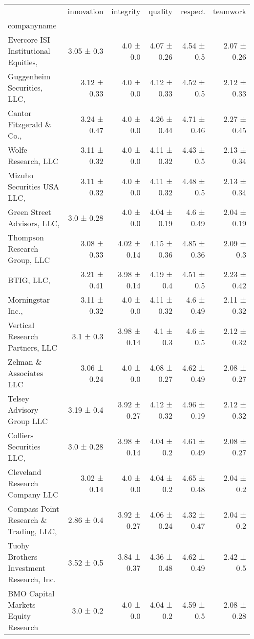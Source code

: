 \begin{tabular}{lrrrrr}
\toprule
 & innovation & integrity & quality & respect & teamwork \\
companyname &  &  &  &  &  \\
\midrule
Evercore ISI Institutional Equities,  & 3.05 ± 0.3 & 4.0 ± 0.0 & 4.07 ± 0.26 & 4.54 ± 0.5 & 2.07 ± 0.26 \\
Guggenheim Securities, LLC,  & 3.12 ± 0.33 & 4.0 ± 0.0 & 4.12 ± 0.33 & 4.52 ± 0.5 & 2.12 ± 0.33 \\
Cantor Fitzgerald \& Co.,  & 3.24 ± 0.47 & 4.0 ± 0.0 & 4.26 ± 0.44 & 4.71 ± 0.46 & 2.27 ± 0.45 \\
Wolfe Research, LLC & 3.11 ± 0.32 & 4.0 ± 0.0 & 4.11 ± 0.32 & 4.43 ± 0.5 & 2.13 ± 0.34 \\
Mizuho Securities USA LLC,  & 3.11 ± 0.32 & 4.0 ± 0.0 & 4.11 ± 0.32 & 4.48 ± 0.5 & 2.13 ± 0.34 \\
Green Street Advisors, LLC,  & 3.0 ± 0.28 & 4.0 ± 0.0 & 4.04 ± 0.19 & 4.6 ± 0.49 & 2.04 ± 0.19 \\
Thompson Research Group, LLC & 3.08 ± 0.33 & 4.02 ± 0.14 & 4.15 ± 0.36 & 4.85 ± 0.36 & 2.09 ± 0.3 \\
BTIG, LLC,  & 3.21 ± 0.41 & 3.98 ± 0.14 & 4.19 ± 0.4 & 4.51 ± 0.5 & 2.23 ± 0.42 \\
Morningstar Inc.,  & 3.11 ± 0.32 & 4.0 ± 0.0 & 4.11 ± 0.32 & 4.6 ± 0.49 & 2.11 ± 0.32 \\
Vertical Research Partners, LLC & 3.1 ± 0.3 & 3.98 ± 0.14 & 4.1 ± 0.3 & 4.6 ± 0.5 & 2.12 ± 0.32 \\
Zelman \& Associates LLC & 3.06 ± 0.24 & 4.0 ± 0.0 & 4.08 ± 0.27 & 4.62 ± 0.49 & 2.08 ± 0.27 \\
Telsey Advisory Group LLC & 3.19 ± 0.4 & 3.92 ± 0.27 & 4.12 ± 0.32 & 4.96 ± 0.19 & 2.12 ± 0.32 \\
Colliers Securities LLC,  & 3.0 ± 0.28 & 3.98 ± 0.14 & 4.04 ± 0.2 & 4.61 ± 0.49 & 2.08 ± 0.27 \\
Cleveland Research Company LLC & 3.02 ± 0.14 & 4.0 ± 0.0 & 4.04 ± 0.2 & 4.65 ± 0.48 & 2.04 ± 0.2 \\
Compass Point Research \& Trading, LLC,  & 2.86 ± 0.4 & 3.92 ± 0.27 & 4.06 ± 0.24 & 4.32 ± 0.47 & 2.04 ± 0.2 \\
Tuohy Brothers Investment Research, Inc. & 3.52 ± 0.5 & 3.84 ± 0.37 & 4.36 ± 0.48 & 4.62 ± 0.49 & 2.42 ± 0.5 \\
BMO Capital Markets Equity Research & 3.0 ± 0.2 & 4.0 ± 0.0 & 4.04 ± 0.2 & 4.59 ± 0.5 & 2.08 ± 0.28 \\

\end{tabular}
